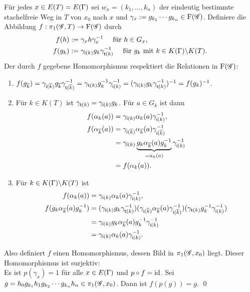 \documentclass[a4paper, 12pt, twoside]{article}
\begin{document}
\bew Für jedes $x\in E(T)=E(\Gamma)$ sei $w_x=(k_1,\ldots,k_n)$
der eindeutig bestimmte stachelfreie Weg in $T$ von $x_0$ nach $x$
und $\gamma_x:=g_{k_1}\cdots g_{k_n}\in\mathrm{F}(\mathscr{G})$.
Definiere die Abbildung $f:\pi_1(\mathscr{G},T)\rightarrow\mathrm{F}(\mathscr{G})$ durch
\begin{align*}
f(h) &:= \gamma_x h \gamma_x^{-1}\quad \text{ für } h\in G_x, \\
f(g_k) &:= \gamma_{\mathsf{i}(k)} g_k \gamma_{\mathsf{t}(k)}^{-1}
\quad \text{ für } g_k \text{ mit } k\in K(\Gamma)\backslash K(T).
\end{align*}
Der durch $f$ gegebene Homomorphismus respektiert die
Relationen in $\mathrm{F}(\mathscr{G})$:
\begin{enumerate}
\item $f(g_{\overline{k}})
=\gamma_{\mathsf{i}(\overline{k})} g_{\overline{k}} \gamma_{\mathsf{t}(\overline{k})}^{-1}
=\gamma_{\mathsf{t}(k)} g_k^{-1}\gamma_{\mathsf{i}(k)}^{-1}
=(\gamma_{\mathsf{i}(k)} g_k \gamma_{\mathsf{t}(k)}^{-1})^{-1}
=f(g_k)^{-1}$.
\item Für $k\in K(T)$ ist $\gamma_{\mathsf{t}(k)}=\gamma_{\mathsf{i}(k)} g_k$.
Für $a\in G_k$ ist dann
\begin{align*}
f(\alpha_k(a)) &= \gamma_{\mathsf{i}(k)} \alpha_k(a) \gamma_{\mathsf{i}(k)}^{-1}, \\
f(\alpha_{\overline{k}}(a))
&= \gamma_{\mathsf{i}(\overline{k})} \alpha_{\overline{k}}(a) \gamma_{\mathsf{i}(\overline{k})}^{-1} \\
&= \gamma_{\mathsf{i}(k)} \underbrace{g_k \alpha_{\overline{k}}(a) g_k^{-1}}_{=\alpha_k(a)} \gamma_{\mathsf{i}(k)}^{-1} \\
&= f(\alpha_k(a)).
\end{align*}
\item Für $k\in K(\Gamma)\backslash K(T)$ ist
\begin{align*}
f(\alpha_k(a)) &= \gamma_{\mathsf{i}(k)} \alpha_k(a) \gamma_{\mathsf{i}(k)}^{-1}, \\
f(g_k \alpha_{\overline{k}}(a) g_k^{-1})
&= (\gamma_{\mathsf{i}(k)}g_k \gamma_{\mathsf{t}(k)}^{-1})
(\gamma_{\mathsf{i}(\overline{k})}\alpha_{\overline{k}}(a)\gamma_{\mathsf{i}(\overline{k})}^{-1})
(\gamma_{\mathsf{t}(k)}g_k^{-1}\gamma_{\mathsf{i}(k)}^{-1})\\
&= \gamma_{\mathsf{i}(k)} g_k \alpha_{\overline{k}}(a) g_k^{-1}\gamma_{\mathsf{i}(k)}^{-1} \\
&= \gamma_{\mathsf{i}(k)}\alpha_{k}(a)\gamma_{\mathsf{i}(k)}^{-1}.
\end{align*}
\end{enumerate}
Also definiert $f$ einen Homomorphismus, dessen Bild in
$\pi_1(\mathscr{G},x_0)$ liegt. Dieser Homomorphismus ist surjektiv:\\
Es ist $p(\gamma_x)=1$ für alle $x\in E(\Gamma)$ und $p\circ f=\mathrm{id}$.
Sei $g=h_0 g_{k_1} h_1 g_{k_2} \cdots g_{k_n} h_n\in\pi_1(\mathscr{G},x_0)$.
Dann ist
$f(p(g))=g$.
\qed
\end{document}
